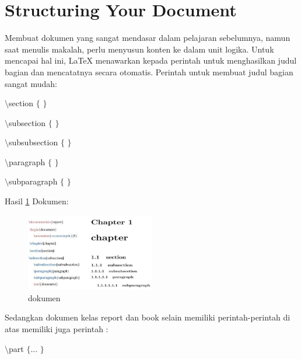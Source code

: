 \section{Structuring Your Document}

\hspace{0.50in} Membuat dokumen yang sangat mendasar dalam pelajaran sebelumnya, namun saat menulis makalah, perlu menyusun konten ke dalam unit logika. Untuk mencapai hal ini, LaTeX menawarkan kepada perintah untuk menghasilkan judul bagian dan mencatatnya secara otomatis. Perintah untuk membuat judul bagian sangat mudah: \par
{\fontsize{10pt}{10pt}\selectfont  $  \setminus  $section $  \{  $ $  \}  $}
 \par
{\fontsize{10pt}{10pt}\selectfont  $  \setminus  $subsection $  \{  $ $  \}  $}
 \par
{\fontsize{10pt}{10pt}\selectfont  $  \setminus  $subsubsection $  \{  $ $  \}  $}
 \par
{\fontsize{10pt}{10pt}\selectfont  $  \setminus  $paragraph $  \{  $ $  \}  $}
 \par
{\fontsize{10pt}{10pt}\selectfont  $  \setminus  $subparagraph $  \{  $ $  \}  $}
 \par

Hasil \ref{dokumen} Dokumen:
\begin{figure}[ht]
	\centerline{\includegraphics[width=0.50\textwidth]{gambar/dokumen}}
	\caption{dokumen}
	\label{dokumen}
\end{figure}

\vspace{50pt}
\hspace{0.50in} Sedangkan dokumen kelas report dan book selain memiliki perintah-perintah di atas memiliki juga perintah :
 \par
{\fontsize{10pt}{10pt}\selectfont  $  \setminus  $part $  \{  $... $  \}  $}
 \par
\vspace{9pt}

